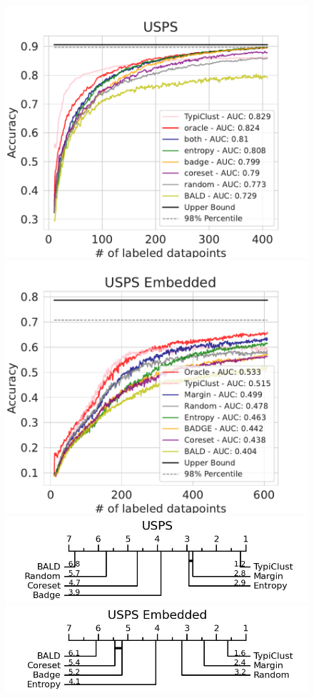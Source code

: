 \documentclass[]{article}
\begin{document}
\begin{figure}[H]
	\centering
	\includegraphics[width=0.49\linewidth]{img/eval_usps}
	\includegraphics[width=0.49\linewidth]{img/eval_usps_enc} \\ [2mm]
	\includegraphics[width=0.49\linewidth]{img/micro_usps.jpg}
	\includegraphics[width=0.49\linewidth]{img/micro_usps_enc.jpg} \\ [4mm]
\end{figure}
\end{document}

